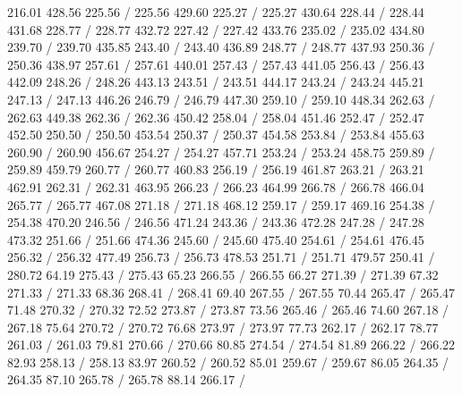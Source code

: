 { 216.01 428.56 225.56 /
 225.56 429.60 225.27 /
 225.27 430.64 228.44 /
 228.44 431.68 228.77 /
 228.77 432.72 227.42 /
 227.42 433.76 235.02 /
 235.02 434.80 239.70 /
 239.70 435.85 243.40 /
 243.40 436.89 248.77 /
 248.77 437.93 250.36 /
 250.36 438.97 257.61 /
 257.61 440.01 257.43 /
 257.43 441.05 256.43 /
 256.43 442.09 248.26 /
 248.26 443.13 243.51 /
 243.51 444.17 243.24 /
 243.24 445.21 247.13 /
 247.13 446.26 246.79 /
 246.79 447.30 259.10 /
 259.10 448.34 262.63 /
 262.63 449.38 262.36 /
 262.36 450.42 258.04 /
 258.04 451.46 252.47 /
 252.47 452.50 250.50 /
 250.50 453.54 250.37 /
 250.37 454.58 253.84 /
 253.84 455.63 260.90 /
 260.90 456.67 254.27 /
 254.27 457.71 253.24 /
 253.24 458.75 259.89 /
 259.89 459.79 260.77 /
 260.77 460.83 256.19 /
 256.19 461.87 263.21 /
 263.21 462.91 262.31 /
 262.31 463.95 266.23 /
 266.23 464.99 266.78 /
 266.78 466.04 265.77 /
 265.77 467.08 271.18 /
 271.18 468.12 259.17 /
 259.17 469.16 254.38 /
 254.38 470.20 246.56 /
 246.56 471.24 243.36 /
 243.36 472.28 247.28 /
 247.28 473.32 251.66 /
 251.66 474.36 245.60 /
 245.60 475.40 254.61 /
 254.61 476.45 256.32 /
 256.32 477.49 256.73 /
 256.73 478.53 251.71 /
 251.71 479.57 250.41 /
\setsolid
{} 280.72 64.19 275.43 /
 275.43 65.23 266.55 /
 266.55 66.27 271.39 /
 271.39 67.32 271.33 /
 271.33 68.36 268.41 /
 268.41 69.40 267.55 /
 267.55 70.44 265.47 /
 265.47 71.48 270.32 /
 270.32 72.52 273.87 /
 273.87 73.56 265.46 /
 265.46 74.60 267.18 /
 267.18 75.64 270.72 /
 270.72 76.68 273.97 /
 273.97 77.73 262.17 /
 262.17 78.77 261.03 /
 261.03 79.81 270.66 /
 270.66 80.85 274.54 /
 274.54 81.89 266.22 /
 266.22 82.93 258.13 /
 258.13 83.97 260.52 /
 260.52 85.01 259.67 /
 259.67 86.05 264.35 /
 264.35 87.10 265.78 /
 265.78 88.14 266.17 /
}
